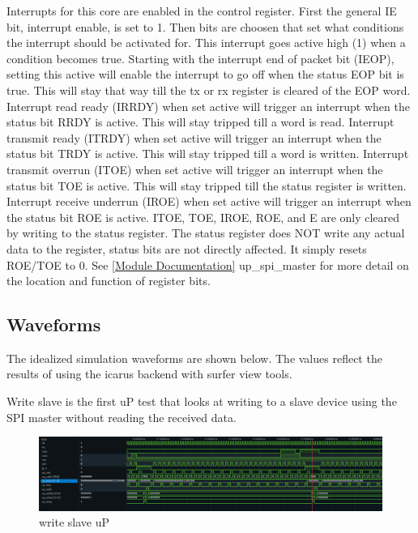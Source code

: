 \par
Interrupts for this core are enabled in the control register. First the general IE bit, interrupt enable, is set to 1. Then bits
are choosen that set what conditions the interrupt should be activated for. This interrupt goes active high (1) when a condition becomes
true. Starting with the interrupt end of packet bit (IEOP), setting this active will enable the interrupt to go off when the status EOP bit
is true. This will stay that way till the tx or rx register is cleared of the EOP word. Interrupt read ready (IRRDY) when set active will trigger
an interrupt when the status bit RRDY is active. This will stay tripped till a word is read. Interrupt transmit ready (ITRDY) when set active will
trigger an interrupt when the status bit TRDY is active. This will stay tripped till a word is written. Interrupt transmit overrun (ITOE) when set
active will trigger an interrupt when the status bit TOE is active. This will stay tripped till the status register is written. Interrupt receive
underrun (IROE) when set active will trigger an interrupt when the status bit ROE is active. ITOE, TOE, IROE, ROE, and E are only cleared by writing to the
status register. The status register does NOT write any actual data to the register, status bits are not directly affected. It simply
resets ROE/TOE to 0. See \ref{Module Documentation} up\_spi\_master for more detail on the location and function of register bits.

\subsection{Waveforms}
The idealized simulation waveforms are shown below. The values reflect the results of using the icarus backend with surfer view tools.

\par
Write slave is the first uP test that looks at writing to a slave device using the SPI master without reading the received data.
\begin{figure}[H]
\caption{write slave uP}
\centering
\includegraphics[width=\textwidth]{img/diagrams/waveform_write_slave_up.png}
\end{figure}


